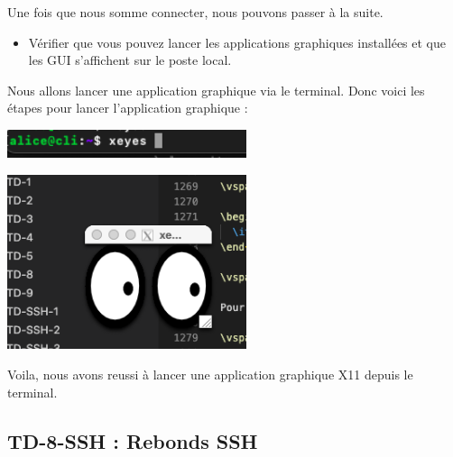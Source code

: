 \documentclass[12pt]{article}
\begin{document}
\vspace{0.3cm}

Une fois que nous somme connecter, nous pouvons passer à la suite. 

\vspace{0.3cm}

\begin{itemize}
  \item Vérifier que vous pouvez lancer les applications graphiques installées et que les GUI s'affichent sur le poste local.
\end{itemize}

\vspace{0.3cm}

Nous allons lancer une application graphique via le terminal. Donc voici les étapes pour lancer l'application graphique : 

\vspace{0.3cm}

\begin{center}
  \includegraphics[width=7cm]{Image-TD-SSH-7/Commande-xeyes.png}
\end{center}

\vspace{0.3cm}

\begin{center}
  \includegraphics[width=7cm]{Image-TD-SSH-7/Application-X11.png}
\end{center}

\vspace{0.3cm}

Voila, nous avons reussi à lancer une application graphique X11 depuis le terminal.

\newpage

\subsection{TD-8-SSH : Rebonds SSH}
\end{document}
